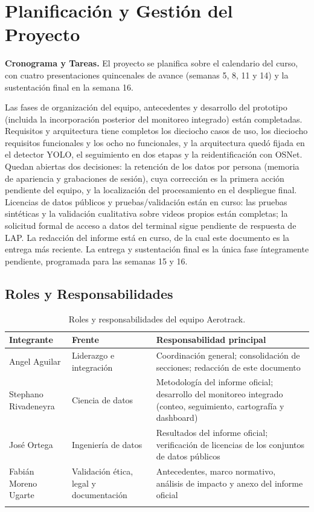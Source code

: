 \section{Planificación y Gestión del Proyecto}
\label{sec:planificacion}

\textbf{Cronograma y Tareas.} El proyecto se planifica sobre el calendario del curso, con
cuatro presentaciones quincenales de avance (semanas 5, 8, 11 y 14) y la sustentación final en
la semana 16.


Las fases de organización del equipo, antecedentes y desarrollo del prototipo (incluida la
incorporación posterior del monitoreo integrado) están completadas. Requisitos y arquitectura
tiene completos los dieciocho casos de uso, los dieciocho requisitos funcionales y los ocho no
funcionales, y la arquitectura quedó fijada en el detector YOLO, el seguimiento en dos etapas y la
reidentificación con OSNet. Quedan abiertas dos decisiones: la retención de los datos por
persona (memoria de apariencia y grabaciones de sesión), cuya corrección es la primera acción
pendiente del equipo, y la localización del procesamiento en el despliegue final. Licencias de datos públicos y pruebas/validación están en curso: las pruebas
sintéticas y la validación cualitativa sobre videos propios están completas; la solicitud formal
de acceso a datos del terminal sigue pendiente de respuesta de LAP. La redacción del informe
está en curso, de la cual este documento es la entrega más reciente. La entrega y sustentación
final es la única fase íntegramente pendiente, programada para las semanas 15 y 16.

\subsection{Roles y Responsabilidades}
\label{subsec:roles-responsabilidades}

\begin{longtable}{@{}L{3.6cm}L{3.8cm}L{7.2cm}@{}}
\toprule
\textbf{Integrante} & \textbf{Frente} & \textbf{Responsabilidad principal} \\
\midrule
\endhead
Angel Aguilar & Liderazgo e integración & Coordinación general; consolidación de secciones;
  redacción de este documento \\
Stephano Rivadeneyra & Ciencia de datos & Metodología del informe oficial; desarrollo del
  monitoreo integrado (conteo, seguimiento, cartografía y dashboard) \\
José Ortega & Ingeniería de datos & Resultados del informe oficial; verificación de licencias
  de los conjuntos de datos públicos \\
Fabián Moreno Ugarte & Validación ética, legal y documentación & Antecedentes, marco
  normativo, análisis de impacto y anexo del informe oficial \\
\bottomrule
\caption{Roles y responsabilidades del equipo Aerotrack.}
\label{tab:roles}
\end{longtable}
